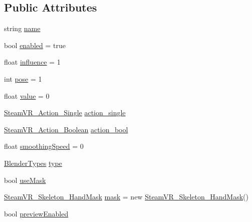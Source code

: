 \subsection*{Public Attributes}
\begin{DoxyCompactItemize}
\item 
string \mbox{\hyperlink{class_valve_1_1_v_r_1_1_steam_v_r___skeleton___poser_1_1_pose_blending_behaviour_a8f5f0146a762075578e55e4227deb293}{name}}
\item 
bool \mbox{\hyperlink{class_valve_1_1_v_r_1_1_steam_v_r___skeleton___poser_1_1_pose_blending_behaviour_a9f6513d95fdc2c3dfa50d2382f83a820}{enabled}} = true
\item 
float \mbox{\hyperlink{class_valve_1_1_v_r_1_1_steam_v_r___skeleton___poser_1_1_pose_blending_behaviour_aaa87292519e67bda8b14e7ab90adddbe}{influence}} = 1
\item 
int \mbox{\hyperlink{class_valve_1_1_v_r_1_1_steam_v_r___skeleton___poser_1_1_pose_blending_behaviour_aa17c7151ab504eec88b2bd2d498dd3c5}{pose}} = 1
\item 
float \mbox{\hyperlink{class_valve_1_1_v_r_1_1_steam_v_r___skeleton___poser_1_1_pose_blending_behaviour_a568977e5e79d917cc528f84c97975496}{value}} = 0
\item 
\mbox{\hyperlink{class_valve_1_1_v_r_1_1_steam_v_r___action___single}{Steam\+V\+R\+\_\+\+Action\+\_\+\+Single}} \mbox{\hyperlink{class_valve_1_1_v_r_1_1_steam_v_r___skeleton___poser_1_1_pose_blending_behaviour_a1ed7cf4536f437f08d324beb7453478a}{action\+\_\+single}}
\item 
\mbox{\hyperlink{class_valve_1_1_v_r_1_1_steam_v_r___action___boolean}{Steam\+V\+R\+\_\+\+Action\+\_\+\+Boolean}} \mbox{\hyperlink{class_valve_1_1_v_r_1_1_steam_v_r___skeleton___poser_1_1_pose_blending_behaviour_affadc0ecfaf96a682b31125451fc1545}{action\+\_\+bool}}
\item 
float \mbox{\hyperlink{class_valve_1_1_v_r_1_1_steam_v_r___skeleton___poser_1_1_pose_blending_behaviour_a9caa55f6ea9e467f485eab9901ab4389}{smoothing\+Speed}} = 0
\item 
\mbox{\hyperlink{class_valve_1_1_v_r_1_1_steam_v_r___skeleton___poser_1_1_pose_blending_behaviour_a21b1f78c5e6dbf96a079d555954a6ae6}{Blender\+Types}} \mbox{\hyperlink{class_valve_1_1_v_r_1_1_steam_v_r___skeleton___poser_1_1_pose_blending_behaviour_a4c3ae2a5e4dab7131025c2fe2f7bf70a}{type}}
\item 
bool \mbox{\hyperlink{class_valve_1_1_v_r_1_1_steam_v_r___skeleton___poser_1_1_pose_blending_behaviour_acc05cd5cd874696a985e829c7a499b87}{use\+Mask}}
\item 
\mbox{\hyperlink{class_valve_1_1_v_r_1_1_steam_v_r___skeleton___hand_mask}{Steam\+V\+R\+\_\+\+Skeleton\+\_\+\+Hand\+Mask}} \mbox{\hyperlink{class_valve_1_1_v_r_1_1_steam_v_r___skeleton___poser_1_1_pose_blending_behaviour_a3ee39c0e34b033e74439408e82578c59}{mask}} = new \mbox{\hyperlink{class_valve_1_1_v_r_1_1_steam_v_r___skeleton___hand_mask}{Steam\+V\+R\+\_\+\+Skeleton\+\_\+\+Hand\+Mask}}()
\item 
bool \mbox{\hyperlink{class_valve_1_1_v_r_1_1_steam_v_r___skeleton___poser_1_1_pose_blending_behaviour_a6ea54bd6b1807b301f55dcefe0531128}{preview\+Enabled}}
\end{DoxyCompactItemize}


